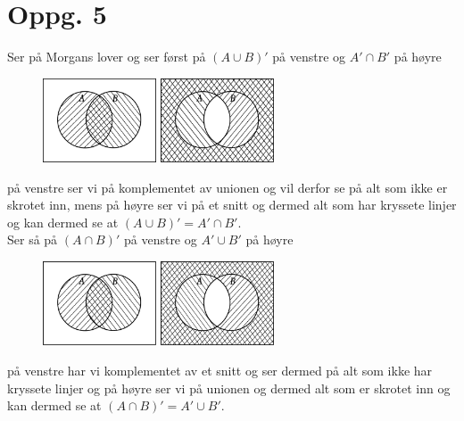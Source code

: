 \documentclass{report}
\begin{document}
\section*{Oppg. 5}
Ser på Morgans lover og ser først på $(A\cup B)'$ på venstre og $A' \cap B'$ på høyre
\begin{figure}[H]
  \centering
  \includegraphics[width=0.3\textwidth]{pics/morgan_one.pdf} \;\;\;
  \includegraphics[width=0.3\textwidth]{pics/morgan_two.pdf}
\end{figure}
på venstre ser vi på komplementet av unionen og vil derfor se på alt som ikke er skrotet inn, mens på høyre ser vi på et snitt og dermed alt som har kryssete linjer og kan dermed se at $(A\cup B)' = A' \cap B'$. \\

Ser så på $(A\cap B)'$ på venstre og $A' \cup B'$ på høyre
\begin{figure}[H]
  \centering
  \includegraphics[width=0.3\textwidth]{pics/morgan_three.pdf} \;\;\;
  \includegraphics[width=0.3\textwidth]{pics/morgan_four.pdf}
\end{figure}
på venstre har vi komplementet av et snitt og ser dermed på alt som ikke har kryssete linjer og på høyre ser vi på unionen og dermed alt som er skrotet inn og kan dermed se at $(A\cap B)' = A' \cup B'$. \\
\end{document}
